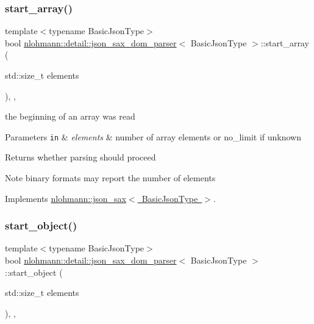 \subsubsection{\texorpdfstring{start\+\_\+array()}{start\_array()}}
{\footnotesize\ttfamily template$<$typename Basic\+Json\+Type$>$ \\
bool \mbox{\hyperlink{classnlohmann_1_1detail_1_1json__sax__dom__parser}{nlohmann\+::detail\+::json\+\_\+sax\+\_\+dom\+\_\+parser}}$<$ Basic\+Json\+Type $>$\+::start\+\_\+array (\begin{DoxyParamCaption}\item[{std\+::size\+\_\+t}]{elements }\end{DoxyParamCaption})\hspace{0.3cm}{\ttfamily [inline]}, {\ttfamily [override]}, {\ttfamily [virtual]}}



the beginning of an array was read 


\begin{DoxyParams}[1]{Parameters}
\mbox{\tt in}  & {\em elements} & number of array elements or no\+\_\+limit if unknown \\
\hline
\end{DoxyParams}
\begin{DoxyReturn}{Returns}
whether parsing should proceed 
\end{DoxyReturn}
\begin{DoxyNote}{Note}
binary formats may report the number of elements 
\end{DoxyNote}


Implements \mbox{\hyperlink{structnlohmann_1_1json__sax_aa7717e96a46e41984260ebabab262369}{nlohmann\+::json\+\_\+sax$<$ Basic\+Json\+Type $>$}}.

\mbox{\label{classnlohmann_1_1detail_1_1json__sax__dom__parser_aa4b694ee448999880c567218778f5078}} 
\subsubsection{\texorpdfstring{start\+\_\+object()}{start\_object()}}
{\footnotesize\ttfamily template$<$typename Basic\+Json\+Type$>$ \\
bool \mbox{\hyperlink{classnlohmann_1_1detail_1_1json__sax__dom__parser}{nlohmann\+::detail\+::json\+\_\+sax\+\_\+dom\+\_\+parser}}$<$ Basic\+Json\+Type $>$\+::start\+\_\+object (\begin{DoxyParamCaption}\item[{std\+::size\+\_\+t}]{elements }\end{DoxyParamCaption})\hspace{0.3cm}{\ttfamily [inline]}, {\ttfamily [override]}, {\ttfamily [virtual]}}



